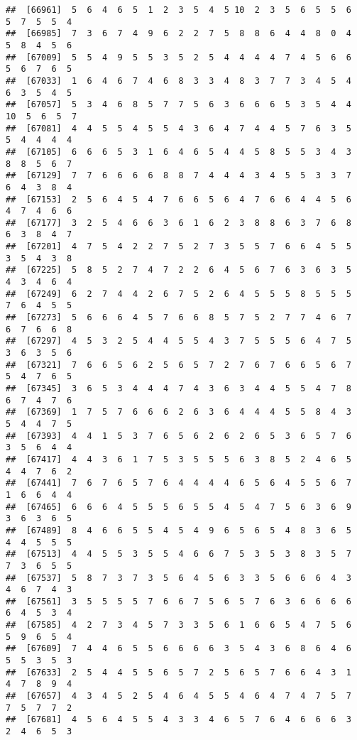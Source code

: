 \documentclass[
]{book}
\begin{document}
\begin{verbatim}
##  [66961]  5  6  4  6  5  1  2  3  5  4  5 10  2  3  5  6  5  5  6  5  7  5  5  4
##  [66985]  7  3  6  7  4  9  6  2  2  7  5  8  8  6  4  4  8  0  4  5  8  4  5  6
##  [67009]  5  5  4  9  5  5  3  5  2  5  4  4  4  4  7  4  5  6  6  5  6  7  6  5
##  [67033]  1  6  4  6  7  4  6  8  3  3  4  8  3  7  7  3  4  5  4  6  3  5  4  5
##  [67057]  5  3  4  6  8  5  7  7  5  6  3  6  6  6  5  3  5  4  4 10  5  6  5  7
##  [67081]  4  4  5  5  4  5  5  4  3  6  4  7  4  4  5  7  6  3  5  5  4  4  4  4
##  [67105]  6  6  6  5  3  1  6  4  6  5  4  4  5  8  5  5  3  4  3  8  8  5  6  7
##  [67129]  7  7  6  6  6  6  8  8  7  4  4  4  3  4  5  5  3  3  7  6  4  3  8  4
##  [67153]  2  5  6  4  5  4  7  6  6  5  6  4  7  6  6  4  4  5  6  4  7  4  6  6
##  [67177]  3  2  5  4  6  6  3  6  1  6  2  3  8  8  6  3  7  6  8  6  3  8  4  7
##  [67201]  4  7  5  4  2  2  7  5  2  7  3  5  5  7  6  6  4  5  5  3  5  4  3  8
##  [67225]  5  8  5  2  7  4  7  2  2  6  4  5  6  7  6  3  6  3  5  4  3  4  6  4
##  [67249]  6  2  7  4  4  2  6  7  5  2  6  4  5  5  5  8  5  5  5  7  6  4  5  5
##  [67273]  5  6  6  6  4  5  7  6  6  8  5  7  5  2  7  7  4  6  7  6  7  6  6  8
##  [67297]  4  5  3  2  5  4  4  5  5  4  3  7  5  5  5  6  4  7  5  3  6  3  5  6
##  [67321]  7  6  6  5  6  2  5  6  5  7  2  7  6  7  6  6  5  6  7  5  4  7  6  5
##  [67345]  3  6  5  3  4  4  4  7  4  3  6  3  4  4  5  5  4  7  8  6  7  4  7  6
##  [67369]  1  7  5  7  6  6  6  2  6  3  6  4  4  4  5  5  8  4  3  5  4  4  7  5
##  [67393]  4  4  1  5  3  7  6  5  6  2  6  2  6  5  3  6  5  7  6  3  5  6  4  4
##  [67417]  4  4  3  6  1  7  5  3  5  5  5  6  3  8  5  2  4  6  5  4  4  7  6  2
##  [67441]  7  6  7  6  5  7  6  4  4  4  4  6  5  6  4  5  5  6  7  1  6  6  4  4
##  [67465]  6  6  6  4  5  5  5  6  5  5  4  5  4  7  5  6  3  6  9  3  6  3  6  5
##  [67489]  8  4  6  6  5  5  4  5  4  9  6  5  6  5  4  8  3  6  5  4  4  5  5  5
##  [67513]  4  4  5  5  3  5  5  4  6  6  7  5  3  5  3  8  3  5  7  7  3  6  5  5
##  [67537]  5  8  7  3  7  3  5  6  4  5  6  3  3  5  6  6  6  4  3  4  6  7  4  3
##  [67561]  3  5  5  5  5  7  6  6  7  5  6  5  7  6  3  6  6  6  6  6  4  5  3  4
##  [67585]  4  2  7  3  4  5  7  3  3  5  6  1  6  6  5  4  7  5  6  5  9  6  5  4
##  [67609]  7  4  4  6  5  5  6  6  6  6  3  5  4  3  6  8  6  4  6  5  5  3  5  3
##  [67633]  2  5  4  4  5  5  6  5  7  2  5  6  5  7  6  6  4  3  1  4  7  8  9  4
##  [67657]  4  3  4  5  2  5  4  6  4  5  5  4  6  4  7  4  7  5  7  7  5  7  7  2
##  [67681]  4  5  6  4  5  5  4  3  3  4  6  5  7  6  4  6  6  6  3  2  4  6  5  3

\end{verbatim}
\end{document}
